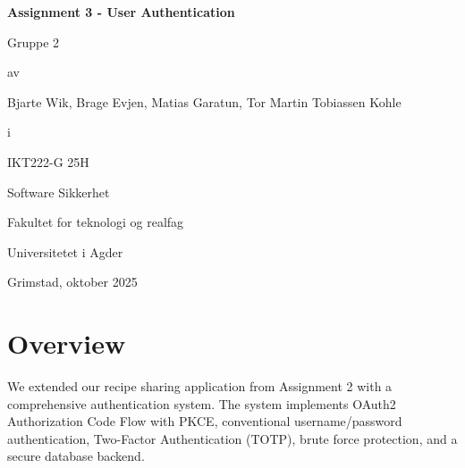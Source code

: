 \documentclass[12pt,a4paper]{article}
\begin{document}
\begin{titlepage}
    \centering
    \vspace*{1cm}

    \vspace{1.5cm}

    {\Huge\bfseries Assignment 3 - User Authentication\par}

    \vspace{1cm}

    {\Large Gruppe 2\par}

    \vspace{0.5cm}

    {\large av\par}

    \vspace{0.5cm}

    {\large Bjarte Wik, Brage Evjen, Matias Garatun, Tor Martin Tobiassen Kohle\par}

    \vspace{1cm}

    {\large i\par}

    \vspace{0.5cm}

    {\large IKT222-G 25H\par}
    {\large Software Sikkerhet\par}

    \vspace{1.5cm}

    {\large Fakultet for teknologi og realfag\par}
    {\large Universitetet i Agder\par}

    \vfill

    {\large Grimstad, oktober 2025\par}

\end{titlepage}

\tableofcontents
\newpage

\section{Overview}

We extended our recipe sharing application from Assignment 2 with a comprehensive authentication system. The system implements OAuth2 Authorization Code Flow with PKCE, conventional username/password authentication, Two-Factor Authentication (TOTP), brute force protection, and a secure database backend.
\end{document}

